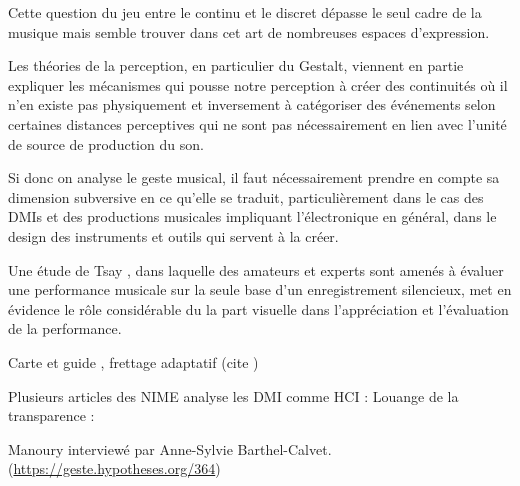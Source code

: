 Cette question du jeu entre le continu et le discret dépasse le seul cadre de la musique mais semble trouver dans cet art de nombreuses espaces d'expression.

Les théories de la perception, en particulier du Gestalt, viennent en partie expliquer les mécanismes qui pousse notre perception à créer des continuités où il n'en existe pas physiquement et inversement à catégoriser des événements selon certaines distances perceptives qui ne sont pas nécessairement en lien avec l'unité de source de production du son.

Si donc on analyse le geste musical, il faut nécessairement prendre en compte sa dimension subversive en ce qu'elle se traduit, particulièrement dans le cas des DMIs et des productions musicales impliquant l'électronique en général, dans le design des instruments et outils qui servent à la créer.

\cite{bin_show_2018}

Une étude de Tsay \cite{tsay_sight_2013}, dans laquelle des amateurs et experts sont amenés à évaluer une performance musicale sur la seule base d'un enregistrement silencieux, met en évidence le rôle considérable du la part visuelle dans l'appréciation et l'évaluation de la performance.

Carte et guide , frettage adaptatif (cite \cite{goudard_playing_2014})


Plusieurs articles des NIME analyse les DMI comme \gls{HCI} : 
Louange de la transparence : \cite{fels_mapping_2002}

 Manoury interviewé par Anne-Sylvie Barthel-Calvet. (\url{https://geste.hypotheses.org/364})

